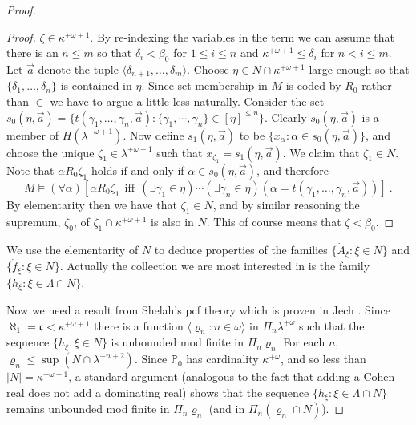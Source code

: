 \documentclass{amsart}
\theoremstyle{plain}
\theoremstyle{definition}
\theoremstyle{remark}
\theoremstyle{plain}
\theoremstyle{definition}
\theoremstyle{remark}
\begin{document}
\begin{proof}
\begin{proof}
              $\zeta\in \kappa^{+\omega+1}$. By
              re-indexing the variables in the term we can assume
              that there is an $n\leq m$ so that
               $\delta_i  <\beta_0$ for $1\leq i\leq n$
                and $\kappa^{+\omega+1}\leq \delta_i$ for $n<i\leq m$.
                Let $\vec a $ denote
                the tuple $\langle \delta_{n+1},\ldots, \delta_m\rangle$.
              Choose $\eta\in N\cap \kappa^{+\omega+1}$ large enough so that
             $ \{  \delta_1, \ldots, \delta_n\}$ is contained in  $\eta$. Since set-membership
             in $M$ is coded by $R_0$ rather than $\in$ we have to argue a little
             less naturally.
             Consider the set
               $s_0(\eta,\vec a) = \{ t(\gamma_1,\ldots, \gamma_n,\vec a) :
            \{\gamma_1,\cdots,\gamma_n\} \in [\eta]^{\leq n}\}$. Clearly
             $s_0(\eta,\vec a)$ is a member of $H(\lambda^{+\omega+1})$.
             Now define $s_1(\eta,\vec a) $ to be
             $\{ x_\alpha : \alpha\in s_0(\eta, \vec a)\}$,
             and choose the
             unique $\zeta_1\in \lambda^{+\omega+1}$ such
             that $x_{\zeta_1} = s_1(\eta,\vec a)$. We claim that $\zeta_1\in N$.
             Note that $\alpha R_0\zeta_1$ holds if and only if
              $ \alpha \in s_0(\eta,\vec a)$, and therefore
             $$M\models (\forall \alpha)\left[\alpha R_0 \zeta_1 ~~\mbox{iff}~~
             (\exists   \gamma_1\in \eta)\cdots(\exists \gamma_n\in\eta)(\alpha=
             t(\gamma_1,\ldots, \gamma_n,\vec a))\right]~.$$
             By elementarity then we have that $\zeta_1\in N$,
             and by similar reasoning the supremum, $\zeta_0$,
            of $\zeta_1\cap \kappa^{+\omega+1}$ is also in $N$.
               This of course means that $\zeta < \beta_0$.
            \end{proof}

            \egroup

            We use the elementarity of
             $N$  to deduce properties of the families
             $\{ \dot A_\xi : \xi\in N\}$ and $\{ \dot f_\xi : \xi \in
             N\}$.  Actually the collection we are most interested in
             is the family $\{ h_\xi : \xi\in \Lambda\cap N\}$.

            Now we need a result from Shelah's pcf theory which
            is proven in  Jech \cite[24.9]{MR1940513}.
             Since  $\aleph_1=\mathfrak c < \kappa^{+\omega+1}$ there
              is a function $\langle \varrho_n : n\in \omega\rangle$
              in $\Pi_n \lambda^{+\omega}   $ such that the sequence
               $\{ h_\xi : \xi \in N\}$ is unbounded mod finite
               in $\Pi_n \varrho_n$
               For each $n$, $\varrho_n \leq \sup(N\cap \lambda^{+n+2})$.
                  Since $\mathbb P_0$ has cardinality $\kappa^{+\omega}$,
            and so less than $|N|=\kappa^{+\omega+1}$, a standard argument
            (analogous to the fact that adding a Cohen real does
             not add a dominating real)
             shows that    the sequence $\{ h_\xi : \xi \in \Lambda\cap N\}$ remains
             unbounded
                mod finite in $\Pi_n \varrho_n$ (and in
                 $\Pi_n (\varrho_n\cap N)$).


\end{proof}
\end{document}
